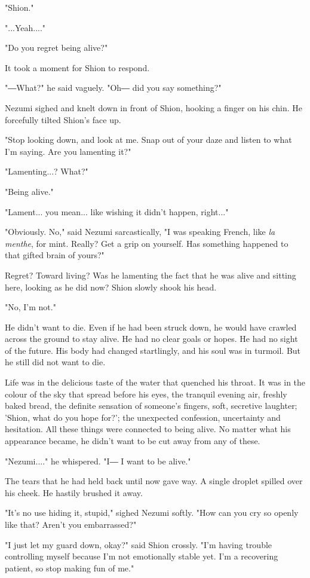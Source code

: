 "Shion."

"...Yeah...."

"Do you regret being alive?"

It took a moment for Shion to respond.

"―What?" he said vaguely. "Oh― did you say something?"

Nezumi sighed and knelt down in front of Shion, hooking a finger on his
chin. He forcefully tilted Shion's face up.

"Stop looking down, and look at me. Snap out of your daze and listen to
what I'm saying. Are you lamenting it?"

"Lamenting...? What?"

"Being alive."

"Lament... you mean... like wishing it didn't happen, right..."

"Obviously. No," said Nezumi sarcastically, "I was speaking French, like
\emph{la menthe}, for mint. Really? Get a grip on yourself. Has
something happened to that gifted brain of yours?"

Regret? Toward living? Was he lamenting the fact that he was alive and
sitting here, looking as he did now? Shion slowly shook his head.

"No, I'm not."

He didn't want to die. Even if he had been struck down, he would have
crawled across the ground to stay alive. He had no clear goals or hopes.
He had no sight of the future. His body had changed startlingly, and his
soul was in turmoil. But he still did not want to die.

Life was in the delicious taste of the water that quenched his throat.
It was in the colour of the sky that spread before his eyes, the
tranquil evening air, freshly baked bread, the definite sensation of
someone's fingers, soft, secretive laughter; 'Shion, what do you hope
for?'; the unexpected confession, uncertainty and hesitation. All these
things were connected to being alive. No matter what his appearance
became, he didn't want to be cut away from any of these.

"Nezumi...." he whispered. "I― I want to be alive."

The tears that he had held back until now gave way. A single droplet
spilled over his cheek. He hastily brushed it away.

"It's no use hiding it, stupid," sighed Nezumi softly. "How can you cry
so openly like that? Aren't you embarrassed?"

"I just let my guard down, okay?" said Shion crossly. "I'm having
trouble controlling myself because I'm not emotionally stable yet. I'm a
recovering patient, so stop making fun of me."

